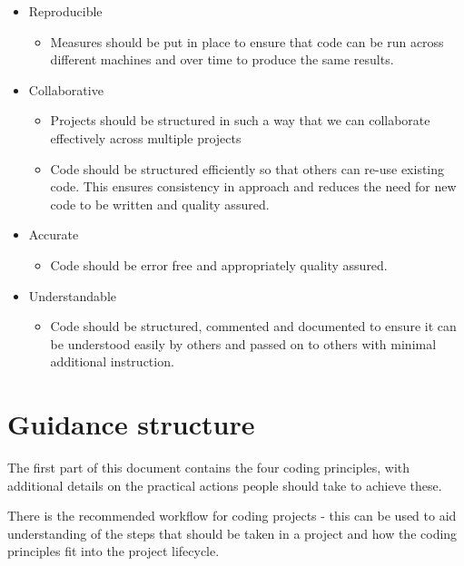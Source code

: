 \documentclass[]{book}
\providecommand{\tightlist}{%
  \setlength{\itemsep}{0pt}\setlength{\parskip}{0pt}}
\begin{document}
\begin{itemize}
\tightlist
\item
  Reproducible

  \begin{itemize}
  \tightlist
  \item
    Measures should be put in place to ensure that code can be run across different machines and over time to produce the same results.\\
  \end{itemize}
\item
  Collaborative

  \begin{itemize}
  \tightlist
  \item
    Projects should be structured in such a way that we can collaborate effectively across multiple projects
  \item
    Code should be structured efficiently so that others can re-use existing code. This ensures consistency in approach and reduces the need for new code to be written and quality assured.\\
  \end{itemize}
\item
  Accurate

  \begin{itemize}
  \tightlist
  \item
    Code should be error free and appropriately quality assured.\\
  \end{itemize}
\item
  Understandable

  \begin{itemize}
  \tightlist
  \item
    Code should be structured, commented and documented to ensure it can be understood easily by others and passed on to others with minimal additional instruction.
  \end{itemize}
\end{itemize}

\hypertarget{structure}{%
\section{Guidance structure}\label{structure}}

The first part of this document contains the four coding principles, with additional details on the practical actions people should take to achieve these.

There is the recommended workflow for coding projects - this can be used to aid understanding of the steps that should be taken in a project and how the coding principles fit into the project lifecycle.
\end{document}
